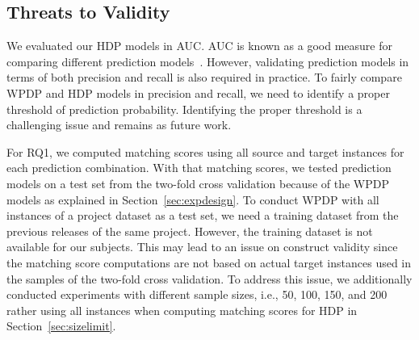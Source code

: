 % 

\subsection{Threats to Validity}


We evaluated our HDP models in AUC.
	AUC is known as a good measure for comparing different prediction
	models~\cite{Giger12,Lessmann08,Rahman12,Song11}. However, validating
	prediction models in terms of both precision and recall is also required in
	practice. To fairly compare WPDP and HDP models in precision
	and recall, we need to identify a proper threshold of prediction probability.
	Identifying the proper threshold is a challenging issue and remains as
	future work.

For RQ1, we computed matching scores using all
	source and target instances for each prediction combination.
	With that matching scores, we tested prediction models on a test set from the two-fold cross validation because of the WPDP models as explained in Section~\ref{sec:expdesign}.
	To conduct WPDP with all instances of a project dataset as a test set, we need a training dataset from the previous releases of the same project. However, the training dataset is not
	available for our subjects. This may lead to an issue on construct validity since the matching score computations are not based on actual target instances used in the samples of the two-fold cross validation. To address this issue, we additionally conducted experiments with different sample sizes, i.e., 50, 100, 150, and 200 rather using all instances when computing matching scores for HDP in Section~\ref{sec:sizelimit}.

